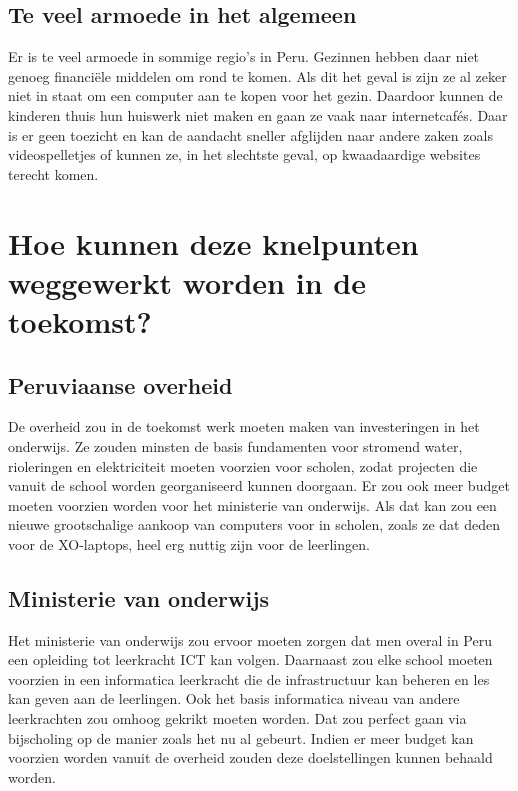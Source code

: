 \subsection{Te veel armoede in het algemeen}
Er is te veel armoede in sommige regio's in Peru. Gezinnen hebben daar niet genoeg financiële middelen om rond te komen. Als dit het geval is zijn ze al zeker niet in staat om een computer aan te kopen voor het gezin. Daardoor kunnen de kinderen thuis hun huiswerk niet maken en gaan ze vaak naar internetcafés. Daar is er geen toezicht en kan de aandacht sneller afglijden naar andere zaken zoals videospelletjes of kunnen ze, in het slechtste geval, op kwaadaardige websites terecht komen.

\section{Hoe kunnen deze knelpunten weggewerkt worden in de toekomst?}

\subsection{Peruviaanse overheid}
De overheid zou in de toekomst werk moeten maken van investeringen in het onderwijs. Ze zouden minsten de basis fundamenten voor stromend water, rioleringen en elektriciteit moeten voorzien voor scholen, zodat projecten die vanuit de school worden georganiseerd kunnen doorgaan. Er zou ook meer budget moeten voorzien worden voor het ministerie van onderwijs. Als dat kan zou een nieuwe grootschalige aankoop van computers voor in scholen, zoals ze dat deden voor de XO-laptops, heel erg nuttig zijn voor de leerlingen. 

\subsection{Ministerie van onderwijs}
Het ministerie van onderwijs zou ervoor moeten zorgen dat men overal in Peru een opleiding tot leerkracht ICT kan volgen. Daarnaast zou elke school moeten voorzien in een informatica leerkracht die de infrastructuur kan beheren en les kan geven aan de leerlingen. Ook het basis informatica niveau van andere leerkrachten zou omhoog gekrikt moeten worden. Dat zou perfect gaan via bijscholing op de manier zoals het nu al gebeurt. Indien er meer budget kan voorzien worden vanuit de overheid zouden deze doelstellingen kunnen behaald worden.

